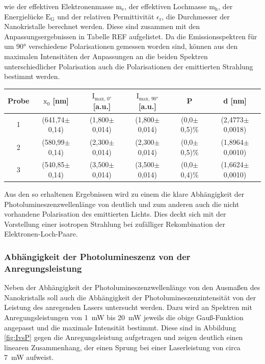         wie der effektiven Elektronenmasse $\text{m}_{\text{e}}$, der effektiven Lochmasse $\text{m}_{\text{h}}$, der Energielücke $\text{E}_{\text{G}}$ und der relativen Permittivität $\epsilon_{\text{r}}$,
        die Durchmesser der Nanokristalle berechnet werden. Diese sind zusammen mit den Anpassungsergebnissen in Tabelle REF aufgelistet. Da die Emissionsspektren für um 90° verschiedene Polarisationen gemessen
        worden sind, können aus den maximalen Intensitäten der Anpassungen an die beiden Spektren unterschiedlicher Polarisation auch die Polarisationen der emittierten Strahlung bestimmt werden.


        \begin{center}
            \label{tab:Werte}
            \begin{tabular}{c c c c c c}
                \toprule
                Probe & $\text{x}_0 $ [nm] & $\text{I}_{\text{max, 0°}}$ [a.u.] & $\text{I}_{\text{max, 90°}}$ [a.u.] & P & d [nm] \\
                \midrule
                1  & (641,74$\pm$0,14) & (1,800$\pm$0,014) & (1,800$\pm$0,014) & (0,0$\pm$0,5)\% & (2,4773$\pm$0,0018) \\
                2  & (580,99$\pm$0,14) & (2,300$\pm$0,014) & (2,300$\pm$0,014) & (0,0$\pm$0,5)\% & (1,8964$\pm$0,0010) \\
                3  & (540,85$\pm$0,14) & (3,500$\pm$0,014) & (3,500$\pm$0,014) & (0,0$\pm$0,4)\% & (1,6624$\pm$0,0010) \\

                \bottomrule
            \end{tabular}
        \end{center}

        Aus den so erhaltenen Ergebnissen wird zu einem die klare Abhängigkeit der Photolumineszenzwellenlänge von deutlich und zum anderen auch die nicht vorhandene Polarisation des emittierten Lichts. Dies deckt
        sich mit der Vorstellung einer isotropen Strahlung bei zufälliger Rekombination der Elektronen-Loch-Paare.


    \subsubsection*{Abhängigkeit der Photolumineszenz von der Anregungsleistung}
        Neben der Abhängigkeit der Photolumineszenzwellenlänge von den Ausmaßen des Nanokristalls soll auch die Abhängigkeit der Photolumineszenzintensität von der Leistung des anregenden Lasers untersucht werden. 
        Dazu wird an Spektren mit Anregungsleistungen von \SI{1}{\milli\watt} bis \SI{20}{\milli\watt} jeweils die obige Gauß-Funktion angepasst und die maximale Intensität bestimmt. Diese sind in Abbildung 
        \ref{fig:IvsP} gegen die Anregungsleistung aufgetragen und zeigen deutlich einen linearen Zusammenhang, der einen Sprung bei einer Laserleistung von circa \SI{7}{\milli\watt} aufweist. 


